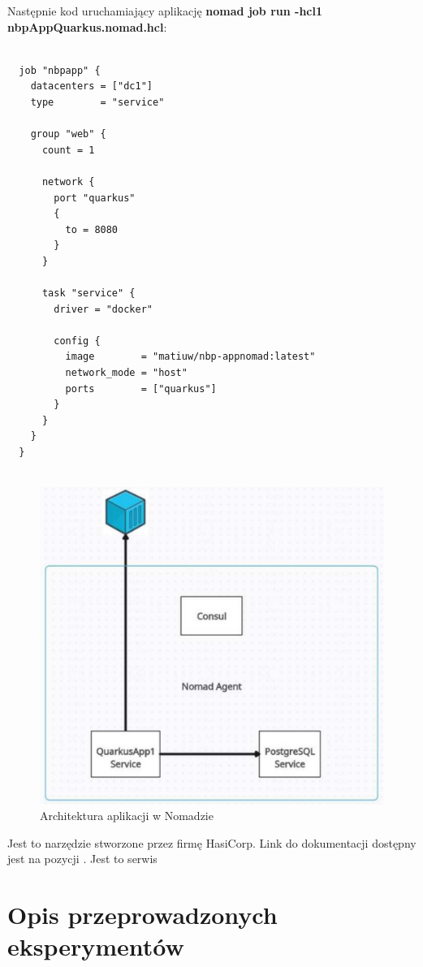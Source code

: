 \documentclass{iiuwb}
\begin{document}
Następnie kod uruchamiający aplikację 
\textbf{nomad job run -hcl1 nbpAppQuarkus.nomad.hcl}:

\begin{lstlisting}[breaklines=true]

  job "nbpapp" {
    datacenters = ["dc1"]
    type        = "service"
  
    group "web" {
      count = 1
  
      network {
        port "quarkus"
        {
          to = 8080
        }
      }
  
      task "service" {
        driver = "docker"
  
        config {
          image        = "matiuw/nbp-appnomad:latest"
          network_mode = "host"
          ports        = ["quarkus"]
        }
      }
    }
  }
  
\end{lstlisting}

\begin{figure}[!h]
\centering
\includegraphics[width=12cm]{nomad/AplikacjaNomad.pdf}
\caption{Architektura aplikacji w Nomadzie}
\label{fig: Architektura aplikacji w Nomadzie}
\end{figure}

Jest to narzędzie stworzone przez firmę HasiCorp. Link do dokumentacji
dostępny jest na pozycji \cite{Consulwww}. Jest to serwis 

\cleardoublepage
\chapter{Opis przeprowadzonych eksperymentów}
\label{cha:Opis eksperymentów}
\end{document}
